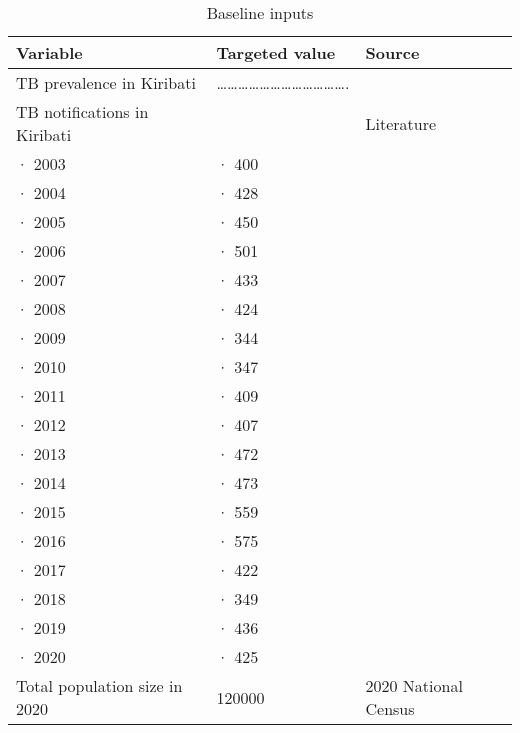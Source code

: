     \begin{table}[!ht]
        \caption {Baseline inputs}  
        \centering
        \begin{tabular}{|l|l|l|}
        \hline
            Variable & Targeted value & Source \\ \hline
            TB prevalence in Kiribati  & ………………………………. & ~ \\ \hline
            TB notifications in Kiribati  & ~ & Literature \\ \hline
            ·         2003 & ·         400 & ~ \\ \hline
            ·         2004 & ·         428 & ~ \\ \hline
            ·         2005 & ·         450 & ~ \\ \hline
            ·         2006 & ·         501 & ~ \\ \hline
            ·         2007 & ·         433 & ~ \\ \hline
            ·         2008 & ·         424 & ~ \\ \hline
            ·         2009 & ·         344 & ~ \\ \hline
            ·         2010 & ·         347 & ~ \\ \hline
            ·         2011 & ·         409 & ~ \\ \hline
            ·         2012 & ·         407 & ~ \\ \hline
            ·         2013 & ·         472 & ~ \\ \hline
            ·         2014 & ·         473 & ~ \\ \hline
            ·         2015 & ·         559 & ~ \\ \hline
            ·         2016 & ·         575 & ~ \\ \hline
            ·         2017 & ·         422 & ~ \\ \hline
            ·         2018 & ·         349 & ~ \\ \hline
            ·         2019 & ·         436 & ~ \\ \hline
            ·         2020 & ·         425 & ~ \\ \hline
            Total population size in 2020 & 120000 & 2020 National Census \\ \hline
        \end{tabular}
    \end{table}
    